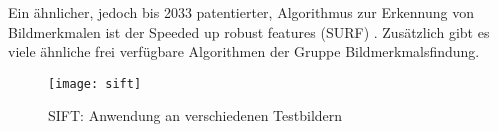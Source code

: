 Ein ähnlicher, jedoch bis 2033 patentierter, Algorithmus zur Erkennung von
Bildmerkmalen ist der \glqq{}Speeded up robust features (SURF)\grqq{}
\parencite{sift-surf}. Zusätzlich gibt es viele ähnliche frei verfügbare 
Algorithmen der Gruppe \glqq{}Bildmerkmalsfindung\grqq{}.

\begin{figure}[H]
    \centering
    \texttt{[image: sift]}
    \caption{SIFT: Anwendung an verschiedenen Testbildern}
    \label{fig:sift}
\end{figure}
